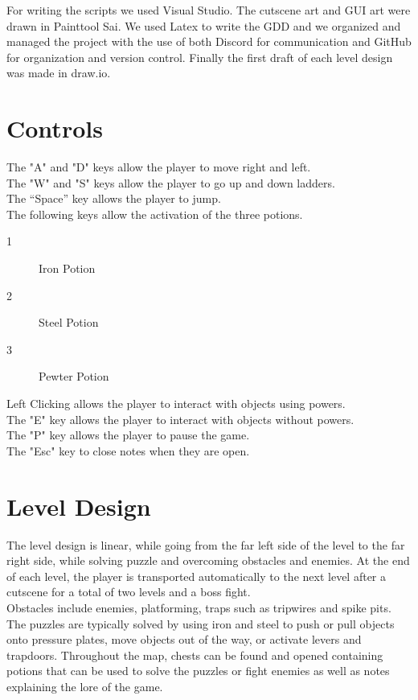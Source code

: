 \documentclass{article}
\begin{document}
For writing the scripts we used Visual Studio. The cutscene art and GUI art were drawn in Painttool Sai. We used Latex to write the GDD and we organized and managed the project with the use of both Discord for communication and GitHub for organization and version control. Finally the first draft of each level design was made in draw.io.

\section{Controls}
The "A" and "D" keys allow the player to move right and left.\\
The "W" and "S" keys allow the player to go up and down ladders.\\
The “Space” key allows the player to jump.\\
The following keys allow the activation of the three potions.
\begin{description}
	\item[1] Iron Potion
	\item[2] Steel Potion
	\item[3] Pewter Potion
\end{description}
Left Clicking allows the player to interact with objects using powers.\\
The "E" key allows the player to interact with objects without powers.\\
The "P" key allows the player to pause the game.\\
The "Esc" key to close notes when they are open.

\section{Level Design}
The level design is linear, while going from the far left side of the level to the far right side, while solving puzzle and overcoming obstacles and enemies. At the end of each level, the player is transported automatically to the next level after a cutscene for a total of two levels and a boss fight.\\

Obstacles include enemies, platforming, traps such as tripwires and spike pits. The puzzles are typically solved by using iron and steel to push or pull objects onto pressure plates, move objects out of the way, or activate levers and trapdoors. Throughout the map, chests can be found and opened containing potions that can be used to solve the puzzles or fight enemies as well as notes explaining the lore of the game.\\
\end{document}
